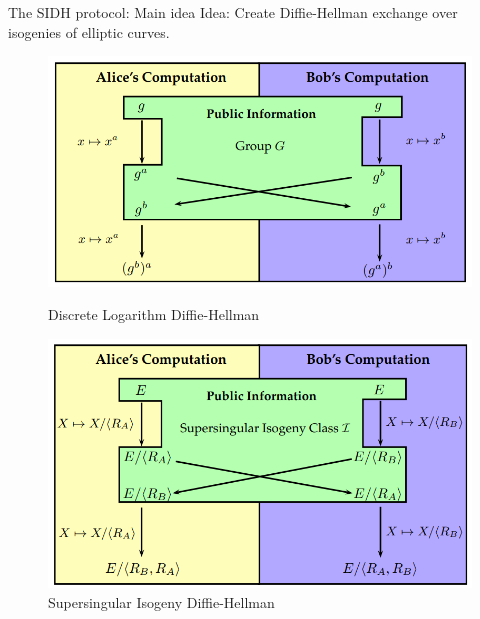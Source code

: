 \documentclass{beamer}
\begin{document}
\begin{frame}{The SIDH protocol: Main idea}
Idea: Create Diffie-Hellman exchange over isogenies of elliptic curves. %
\begin{figure}
	\begin{minipage}{0.5\textwidth}
		\centering
		\includegraphics[width=1\linewidth]{DLDH}
		\caption{Discrete Logarithm Diffie-Hellman}\label{fig:dldh}
	\end{minipage}\hfill
	\begin{minipage}{0.48\textwidth}
		\centering
		\includegraphics[width=1\linewidth]{SIDH}
		\caption{Supersingular Isogeny Diffie-Hellman}\label{fig:sidh}
	\end{minipage}
\end{figure}

\end{frame}
\end{document}
